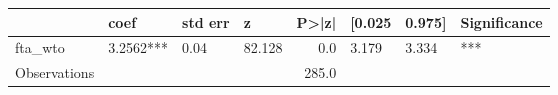 \begin{tabular}{llllrlll}
\toprule
{} &       coef & std err &       z &  P>|z| & [0.025 & 0.975] & Significance \\
\midrule
fta\_wto      &  3.2562*** &    0.04 &  82.128 &    0.0 &  3.179 &  3.334 &          *** \\
Observations &            &         &         &  285.0 &        &        &              \\
\bottomrule
\end{tabular}
